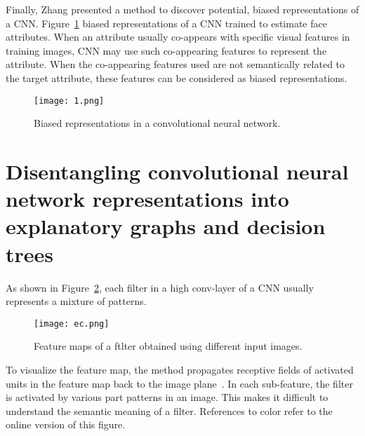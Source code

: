 \documentclass[10pt,twocolumn,letterpaper]{article}
\begin{document}
Finally, Zhang presented a method to discover potential, biased representations of a CNN. Figure~\ref{fig:1} biased representations of a CNN trained to estimate face attributes. When  an attribute usually co-appears with speciﬁc visual features in training images, CNN may use such co-appearing features to represent the attribute. When the co-appearing features used are not semantically related to the target attribute, these features can be considered as biased representations.

\begin{figure}
\begin{center}
\texttt{[image: 1.png]}
\end{center}
\caption{ Biased representations in a convolutional neural network.}
\label{fig:1}
\end{figure}
\section{Disentangling convolutional neural network representations into explanatory graphs and decision trees}

As shown in Figure~\ref{fig:2}, each ﬁlter in a high conv-layer of a CNN usually represents a mixture of patterns.
\begin{figure}[!htb]
\begin{center}
\texttt{[image: ec.png]}
\end{center}
\caption{ Feature maps of a ftlter obtained using diﬀerent input images.}
\label{fig:2}
\end{figure}


To visualize the feature map, the method propagates receptive ﬁelds of activated units in the feature map back to the image plane~\cite{schmidhuber2015deep}. In each sub-feature, the ﬁlter is activated by various part patterns in an image. This makes it difficult to understand the semantic meaning of a ﬁlter. References to color refer to the online version of this ﬁgure.




{\small


}
\end{document}
